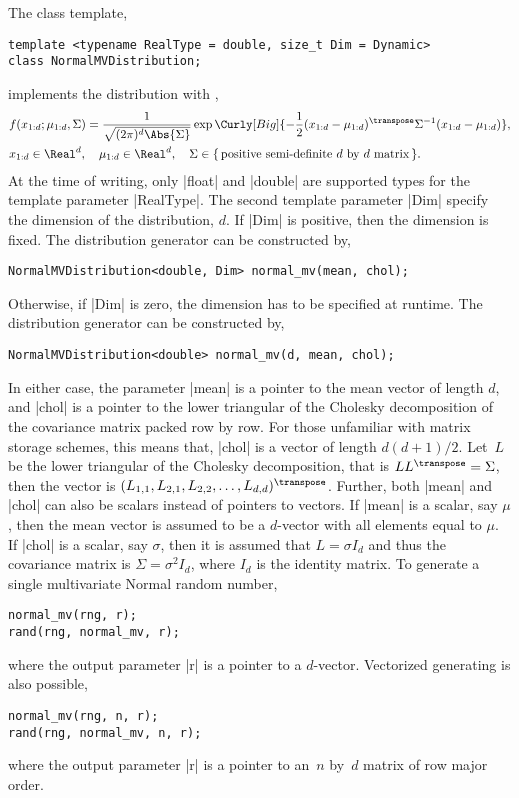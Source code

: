 The class template,
\begin{verbatim}
template <typename RealType = double, size_t Dim = Dynamic>
class NormalMVDistribution;
\end{verbatim}
implements the distribution with \pdf,
\begin{align*}
  &f(x_{1:d};\mu_{1:d},\Sigma) = \frac{1}{\sqrt{(2\pi)^d\Abs{\Sigma}}}
  \exp\Curly[Big]{-\frac{1}{2}(x_{1:d} -
  \mu_{1:d})^{\transpose}\Sigma^{-1}(x_{1:d} - \mu_{1:d})},\\
  &x_{1:d}\in\Real^d,\quad
  \mu_{1:d}\in\Real^d,\quad
  \Sigma\in
  \{\,\text{positive semi-definite }d\text{ by }d\text{ matrix}\,\}.
\end{align*}
At the time of writing, only |float| and |double| are supported types for the
template parameter |RealType|. The second template parameter |Dim| specify the
dimension of the distribution, $d$. If |Dim| is positive, then the dimension is
fixed. The distribution generator can be constructed by,
\begin{verbatim}
NormalMVDistribution<double, Dim> normal_mv(mean, chol);
\end{verbatim}
Otherwise, if |Dim| is zero, the dimension has to be specified at runtime. The
distribution generator can be constructed by,
\begin{verbatim}
NormalMVDistribution<double> normal_mv(d, mean, chol);
\end{verbatim}
In either case, the parameter |mean| is a pointer to the mean vector of length
$d$, and |chol| is a pointer to the lower triangular of the Cholesky
decomposition of the covariance matrix packed row by row. For those unfamiliar
with matrix storage schemes, this means that, |chol| is a vector of length
$d(d+1)/2$. Let~$L$ be the lower triangular of the Cholesky decomposition, that
is $LL^{\transpose} = \Sigma$, then the vector is
$(L_{1,1},L_{2,1},L_{2,2},\dots,L_{d,d})^{\transpose}$. Further, both |mean|
and |chol| can also be scalars instead of pointers to vectors. If |mean| is a
scalar, say $\mu$, then the mean vector is assumed to be a $d$-vector with all
elements equal to $\mu$. If |chol| is a scalar, say $\sigma$, then it is
assumed that $L = \sigma I_d$ and thus the covariance matrix is $\Sigma =
\sigma^2 I_d$, where $I_d$ is the identity matrix. To generate a single
multivariate Normal random number,
\begin{verbatim}
normal_mv(rng, r);
rand(rng, normal_mv, r);
\end{verbatim}
where the output parameter |r| is a pointer to a $d$-vector. Vectorized
generating is also possible,
\begin{verbatim}
normal_mv(rng, n, r);
rand(rng, normal_mv, n, r);
\end{verbatim}
where the output parameter |r| is a pointer to an~$n$ by~$d$ matrix of row
major order.

